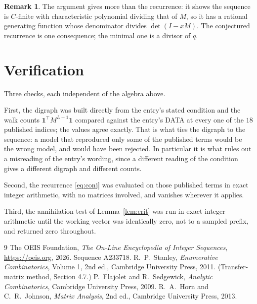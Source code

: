 \documentclass[11pt,a4paper]{article}
\theoremstyle{plain}
\theoremstyle{definition}
\newtheorem{remark}[theorem]{Remark}
\begin{document}
\begin{remark}
The argument gives more than the recurrence: it shows the sequence is $C$-finite with
characteristic polynomial dividing that of $M$, so it has a rational generating function
whose denominator divides $\det(I-xM)$. The conjectured recurrence is one consequence; the
minimal one is a divisor of $q$.
\end{remark}

\section{Verification}

Three checks, each independent of the algebra above.

First, the digraph was built directly from the entry's stated condition and the walk counts
$\mathbf{1}^{\!\top}M^{L-1}\mathbf{1}$ compared against the entry's DATA at
every one of the $18$ published indices; the values agree exactly. That is what ties
the digraph to the sequence: a model that reproduced only some of the published terms would
be the wrong model, and would have been rejected. In particular it is what rules out a
misreading of the entry's wording, since a different reading of the condition gives a
different digraph and different counts.

Second, the recurrence \eqref{eq:conj} was evaluated on those published terms in exact
integer arithmetic, with no matrices involved, and vanishes wherever it applies.

Third, the annihilation test of Lemma~\ref{lem:crit} was run in exact integer arithmetic
until the working vector was identically zero, not to a sampled prefix, and returned zero
throughout.

\begin{thebibliography}{9}
 The OEIS Foundation, \emph{The On-Line Encyclopedia of Integer
Sequences}, \url{https://oeis.org}, 2026. Sequence A233718.
 R.~P.~Stanley, \emph{Enumerative Combinatorics}, Volume 1, 2nd ed.,
Cambridge University Press, 2011. (Transfer-matrix method, Section 4.7.)
 P.~Flajolet and R.~Sedgewick, \emph{Analytic Combinatorics}, Cambridge
University Press, 2009.
 R.~A.~Horn and C.~R.~Johnson, \emph{Matrix Analysis}, 2nd ed., Cambridge
University Press, 2013.
\end{thebibliography}
\end{document}
